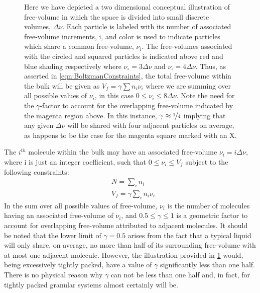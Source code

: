 \begin{figure}[!htbp]
	\caption{Here we have depicted a two dimensional  conceptual illustration of free-volume in which the space is divided into small discrete volumes, $\Delta\nu$.   Each particle is labeled with its number of associated  free-volume increments, i, and color is used to indicate particles which share a common free-volume, $\nu_i$.   The free-volumes associated with the circled and squared particles is indicated above \via red and blue shading respectively where $\nu_\circ=3\Delta\nu$ and $\nu_\square=4\Delta\nu$.   Thus, as asserted in \eqn\nolinebreak \ref{eqn:BoltzmanConstraints}, the total free-volume within the bulk will be given as $V_f=\gamma\sum n_i\nu_i$ where we are summing over all possible values of $\nu_i$, in this case $0\leq \nu_i \leq 8\Delta\nu$.  Note the need for the $\gamma$-factor to account for the overlapping free-volume indicated by the magenta region above.  In this instance, $\gamma\approx\nicefrac{1}{4}$ implying that any given $\Delta \nu$ will be shared with four adjacent particles on average, as happens to be the case for the magenta square marked with an X.}  
	\label{figure:freeVolume}
\end{figure}

\noindent The $i^{th}$ molecule within the bulk may have an associated free-volume $\nu_i=i\Delta\nu$, where i is just an integer coefficient, such that $0\leq\nu_i\leq V_f$ subject to the following constraints:
\begin{equation}
	\begin{split}
		&N=\sum_{i}n_i\\
		&V_f=\gamma\sum_{i}n_i\nu_i
	\end{split}
	\label{eqn:BoltzmanConstraints}
\end{equation}
In the sum over all possible values of free-volume, $\nu_i$ is the number of molecules having an associated free-volume of $\nu_i$, and $0.5\leq\gamma\leq1$ is a geometric factor to account for overlapping free-volume attributed to adjacent molecules.  It should be noted that the lower limit of $\gamma=0.5$ arises from the fact that a typical liquid will only share, on average, no more than half of its surrounding free-volume with at most one adjacent molecule.  However, the  illustration provided in  \fig \nolinebreak \ref{figure:freeVolume} would, being excessively tightly packed, have a value of $\gamma$ significantly less than one half.  There is no physical reason why $\gamma$ can not be less than one half and, in fact, for tightly packed granular systems almost certainly  will be. 

